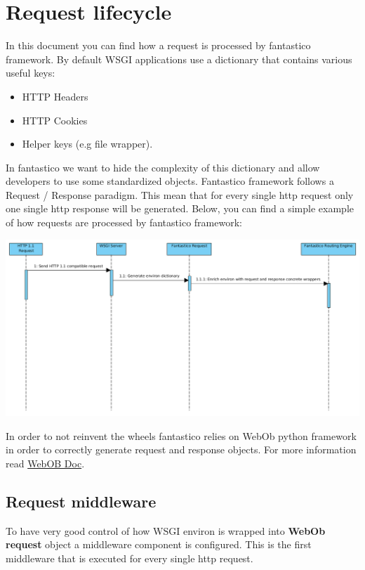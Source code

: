 \documentclass[letterpaper,10pt,english]{sphinxmanual}
\begin{document}
\section{Request lifecycle}
\label{features/request_response:request-lifecycle}\label{features/request_response::doc}
In this document you can find how a request is processed by fantastico framework. By default WSGI applications use a dictionary
that contains various useful keys:
\begin{itemize}
\item {} 
HTTP Headers

\item {} 
HTTP Cookies

\item {} 
Helper keys (e.g file wrapper).

\end{itemize}

In fantastico we want to hide the complexity of this dictionary and allow developers to use some standardized objects. Fantastico
framework follows a Request / Response paradigm. This mean that for every single http request only one single http response will
be generated. Below, you can find a simple example of how requests are processed by fantastico framework:

\includegraphics{request_response_sd.png}

In order to not reinvent the wheels fantastico relies on WebOb python framework in order to correctly generate request and
response objects. For more information read \href{http://docs.webob.org/en/latest/reference.html}{WebOB Doc}.


\subsection{Request middleware}
\label{features/request_response:request-middleware}
To have very good control of how WSGI environ is wrapped into \textbf{WebOb request} object a middleware component is configured. This
is the first middleware that is executed for every single http request.
\end{document}
